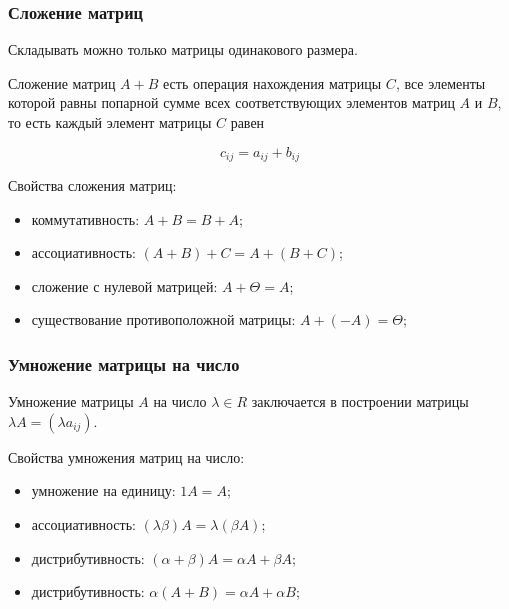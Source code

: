 \documentclass{article}
\begin{document}
\subsubsection*{Сложение матриц}

Складывать можно только матрицы одинакового размера.

Сложение матриц  $A+B$ есть операция нахождения матрицы $C$, все элементы которой равны попарной сумме всех соответствующих элементов матриц $A$ и $B$, то есть каждый элемент матрицы $C$ равен

      $$ c_{ij} = a_{ij} + b_{ij}$$

Свойства сложения матриц:
\begin{itemize}
    \item коммутативность: $A+B = B+A$;
    \item ассоциативность: $(A+B)+C =A+(B+C)$;
    \item сложение с нулевой матрицей: $A + \Theta = A$;
    \item существование противоположной матрицы: $A + (-A) = \Theta$;
\end{itemize}

\subsubsection*{Умножение матрицы на число}

Умножение матрицы $A$ на число $\lambda \in R$ заключается в построении матрицы $\lambda A = ( \lambda a_{ij} )$.



Свойства умножения матриц на число:
\begin{itemize}
    \item умножение на единицу: $1A = A$;
    \item ассоциативность: $(\lambda\beta)A = \lambda(\beta A)$;
    \item дистрибутивность: $(\alpha+\beta)A = \alpha A + \beta A$;
    \item дистрибутивность: $\alpha(A+B) = \alpha A + \alpha B$;
\end{itemize}
\end{document}
